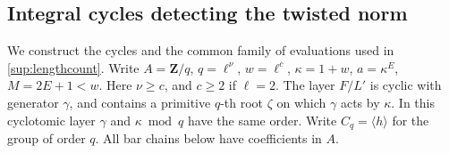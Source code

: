 \subsection{Integral cycles detecting the twisted norm}\label{addc:section}

We construct the cycles and the common family of evaluations used in
\eqref{sup:lengthcount}. Write \(A=\mathbf Z/q\), \(q=\ell^\nu\),
\(w=\ell^c\), \(\kappa=1+w\), \(a=\kappa^E\), \(M=2E+1<w\).
Here \(\nu\ge c\), and \(c\ge2\) if \(\ell=2\). The layer \(F/L'\)
is cyclic with generator \(\gamma\), and contains a primitive
\(q\)-th root \(\zeta\) on which \(\gamma\) acts by \(\kappa\).
In this cyclotomic layer \(\gamma\) and \(\kappa\bmod q\) have the
same order. Write \(C_q=\langle h\rangle\) for the group of order \(q\).
All bar chains below have coefficients in \(A\).

